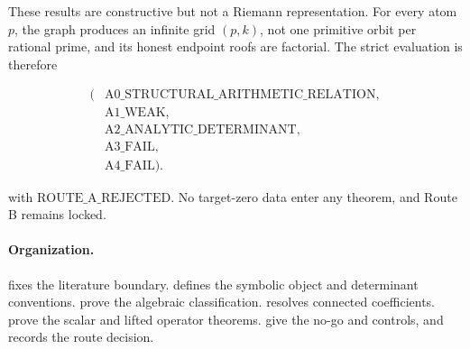 These results are constructive but not a Riemann representation.  For every
atom \(p\), the graph produces an infinite grid \((p,k)\), not one primitive
orbit per rational prime, and its honest endpoint roofs are factorial.  The
strict evaluation is therefore

\[
\begin{aligned}
(&\mathrm{A0\_STRUCTURAL\_ARITHMETIC\_RELATION},\\
 &\mathrm{A1\_WEAK},\\
 &\mathrm{A2\_ANALYTIC\_DETERMINANT},\\
 &\mathrm{A3\_FAIL},\\
 &\mathrm{A4\_FAIL}).
\end{aligned}
\]

with \(\mathrm{ROUTE\_A\_REJECTED}\).  No target-zero data enter any theorem,
and Route B remains locked.

\paragraph{Organization.}
 fixes the literature boundary.
 defines the symbolic object and determinant conventions.
 prove the algebraic classification.
 resolves connected coefficients.
 prove the scalar and lifted operator theorems.
 give the no-go and controls, and
 records the route decision.
